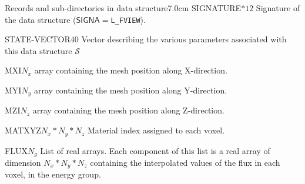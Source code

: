 \begin{DescriptionEnregistrement}{Records and sub-directories
 in  data structure}{7.0cm}
\CharEnr
 {SIGNATURE}{$*12$}
 {Signature of the  data structure ($\mathsf{SIGNA}=${\tt L\_FVIEW}).}

\IntEnr
  {STATE-VECTOR}{$40$}
  {Vector describing the various parameters associated with this data structure
  $\mathcal{S}$}

\RealEnr
  {MXI}{$N_{x}$}{}
  {array containing the mesh position along X-direction.}

\RealEnr
  {MYI}{$N_{y}$}{}
  {array containing the mesh position along Y-direction.}

\RealEnr
  {MZI}{$N_{z}$}{}
  {array containing the mesh position along Z-direction.}

\IntEnr
  {MATXYZ}{$N_{x}*N_{y}*N_{z}$}
  {Material index assigned to each voxel.}

\DirlEnr
  {FLUX}{$N_{g}$}
  {List of real arrays. Each component of this list is a real array of dimension $N_{x}*N_{y}*N_{z}$ containing
   the interpolated values of the flux in each voxel, in the energy group.}

\end{DescriptionEnregistrement}
